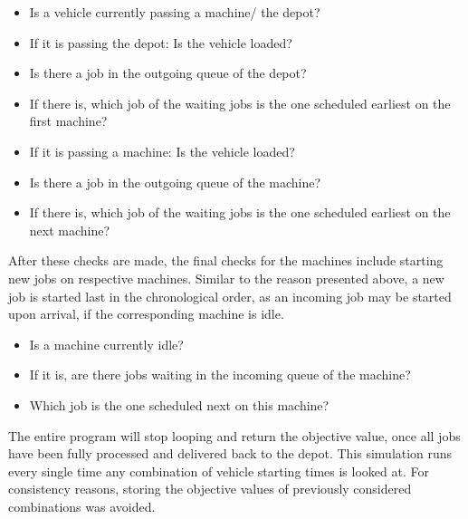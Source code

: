 \begin{itemize}
\item Is a vehicle currently passing a machine/ the depot?

\item If it is passing the depot: Is the vehicle loaded?

\item Is there a job in the outgoing queue of the depot?

\item If there is, which job of the waiting jobs is the one scheduled earliest on the first machine?

\item If it is passing a machine: Is the vehicle loaded?

\item Is there a job in the outgoing queue of the machine?

\item If there is, which job of the waiting jobs is the one scheduled earliest on the next machine?
\end{itemize}

After these checks are made, the final checks for the machines include starting new jobs on respective machines. Similar to the reason presented 
above, a new job is started last in the chronological order, as an incoming job may be started upon arrival, if the corresponding machine is idle.

\begin{itemize}
\item Is a machine currently idle?

\item If it is, are there jobs waiting in the incoming queue of the machine?

\item Which job is the one scheduled next on this machine?
\end{itemize}

The entire program will stop looping and return the objective value, once all jobs have been fully processed and delivered back to the depot. This
simulation runs every single time any combination of vehicle starting times is looked at. For consistency reasons, storing
the objective values of previously considered combinations was avoided.
